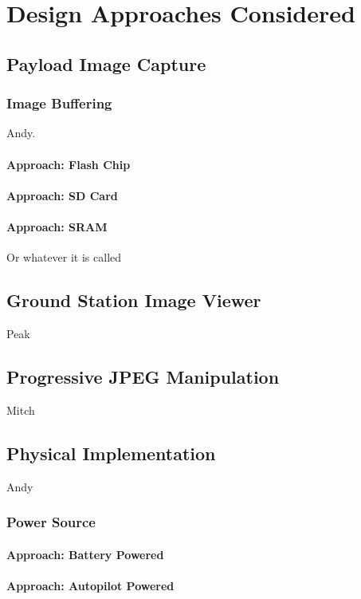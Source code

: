\chapter{Design Approaches Considered}

\section{Payload Image Capture}




\subsection{Image Buffering}
Andy.


\subsubsection{Approach: Flash Chip}

\subsubsection{Approach: SD Card}

\subsubsection{Approach: SRAM}
Or whatever it is called





\section{Ground Station Image Viewer}
Peak

\section{Progressive JPEG Manipulation}
Mitch

\section{Physical Implementation}
Andy
	
\subsection{Power Source}

\subsubsection{Approach: Battery Powered}

\subsubsection{Approach: Autopilot Powered}

